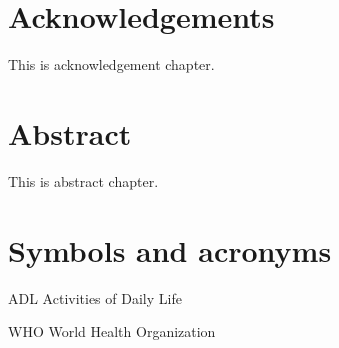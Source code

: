 \documentclass[oneside]{book}
\begin{document}
\coverpage
\tableofcontents
\cleardoublepage 

\chapter*{Acknowledgements}
This is acknowledgement chapter.

\chapter*{Abstract}
This is abstract chapter.

\listoffigures

\listoftables

\chapter*{Symbols and acronyms}

\begin{abbrv}
    \item[ADL]                   Activities of Daily Life
    \item[WHO]                   World Health Organization
\end{abbrv}


\end{document}
